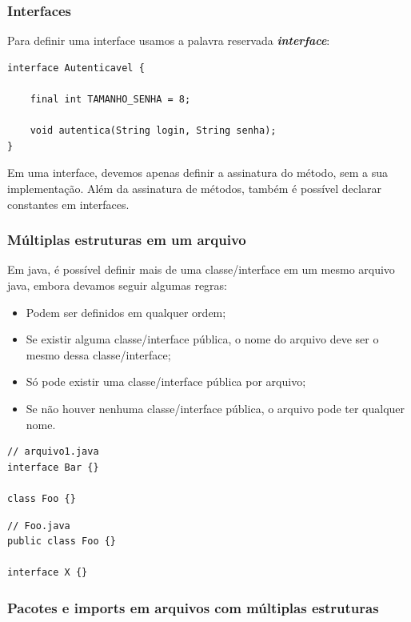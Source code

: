 \documentclass[12pt]{article}
\begin{document}
\subsubsection{Interfaces}

Para definir uma interface usamos a palavra reservada \textbf{\textit{interface}}:

\begin{lstlisting}
interface Autenticavel {
	
	final int TAMANHO_SENHA = 8;
	
	void autentica(String login, String senha);
}
\end{lstlisting}

Em uma interface, devemos apenas definir a assinatura do método, sem a sua implementação. Além da assinatura de métodos, também é possível declarar constantes em interfaces.

\subsubsection{Múltiplas estruturas em um arquivo}

Em java, é possível definir mais de uma classe/interface em um mesmo arquivo java, embora devamos seguir algumas regras:

\begin{itemize}
	\item Podem ser definidos em qualquer ordem;
	\item Se existir alguma classe/interface pública, o nome do arquivo deve ser o mesmo dessa classe/interface;
	\item Só pode existir uma classe/interface pública por arquivo;
	\item Se não houver nenhuma classe/interface pública, o arquivo pode ter qualquer nome.
\end{itemize}

\begin{lstlisting}
// arquivo1.java
interface Bar {}

class Foo {}
\end{lstlisting}


\begin{lstlisting}
// Foo.java
public class Foo {}

interface X {}
\end{lstlisting}

\subsubsection{Pacotes e imports em arquivos com múltiplas estruturas}
\end{document}
